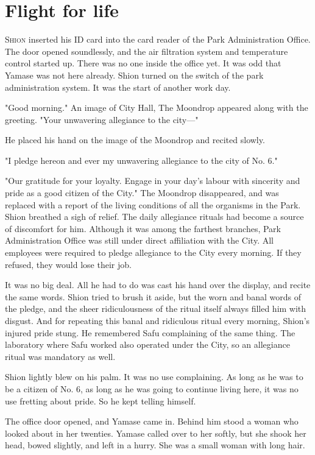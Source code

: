 
\chapter{Flight for life}

\lettrine{S}{hion} inserted his ID card into the card reader of the Park
Administration Office. The door opened soundlessly, and the air
filtration system and temperature control started up. There was no one
inside the office yet. It was odd that Yamase was not here already.
Shion turned on the switch of the park administration system. It was the
start of another work day.

"Good morning." An image of City Hall, The Moondrop appeared along with
the greeting. "Your unwavering allegiance to the city---"

He placed his hand on the image of the Moondrop and recited slowly.

"I pledge hereon and ever my unwavering allegiance to the city of No.
6."

"Our gratitude for your loyalty. Engage in your day's labour with
sincerity and pride as a good citizen of the City." The Moondrop
disappeared, and was replaced with a report of the living conditions of
all the organisms in the Park. Shion breathed a sigh of relief. The
daily allegiance rituals had become a source of discomfort for him.
Although it was among the farthest branches, Park Administration Office
was still under direct affiliation with the City. All employees were
required to pledge allegiance to the City every morning. If they
refused, they would lose their job.

It was no big deal. All he had to do was cast his hand over the display,
and recite the same words. Shion tried to brush it aside, but the worn
and banal words of the pledge, and the sheer ridiculousness of the
ritual itself always filled him with disgust. And for repeating this
banal and ridiculous ritual every morning, Shion's injured pride stung.
He remembered Safu complaining of the same thing. The laboratory where
Safu worked also operated under the City, so an allegiance ritual was
mandatory as well.

Shion lightly blew on his palm. It was no use complaining. As long as he
was to be a citizen of No. 6, as long as he was going to continue living
here, it was no use fretting about pride. So he kept telling himself.

The office door opened, and Yamase came in. Behind him stood a woman who
looked about in her twenties. Yamase called over to her softly, but she
shook her head, bowed slightly, and left in a hurry. She was a small
woman with long hair.

